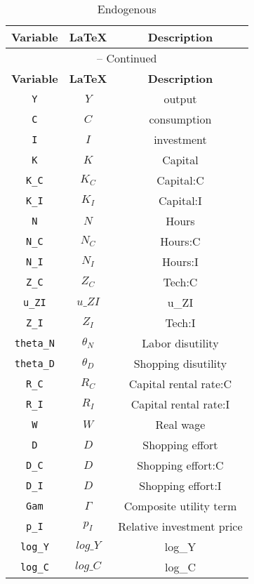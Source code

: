 \begin{center}
\begin{longtable}{ccc}
\caption{Endogenous}\\%
\hline%
\multicolumn{1}{c}{\textbf{Variable}} &
\multicolumn{1}{c}{\textbf{\LaTeX}} &
\multicolumn{1}{c}{\textbf{Description}}\\%
\hline\hline%
\endfirsthead
\multicolumn{3}{c}{{\tablename} \thetable{} -- Continued}\\%
\hline%
\multicolumn{1}{c}{\textbf{Variable}} &
\multicolumn{1}{c}{\textbf{\LaTeX}} &
\multicolumn{1}{c}{\textbf{Description}}\\%
\hline\hline%
\endhead
\texttt{Y} & ${Y}$ & output\\
\texttt{C} & ${C}$ & consumption\\
\texttt{I} & ${I}$ & investment\\
\texttt{K} & ${K}$ & Capital\\
\texttt{K\_C} & ${K_C}$ & Capital:C\\
\texttt{K\_I} & ${K_I}$ & Capital:I\\
\texttt{N} & ${N}$ & Hours\\
\texttt{N\_C} & ${N_C}$ & Hours:C\\
\texttt{N\_I} & ${N_I}$ & Hours:I\\
\texttt{Z\_C} & ${Z_C}$ & Tech:C\\
\texttt{u\_ZI} & $u\_ZI$ & u\_ZI\\
\texttt{Z\_I} & ${Z_I}$ & Tech:I\\
\texttt{theta\_N} & ${\theta_N}$ & Labor disutility\\
\texttt{theta\_D} & ${\theta_D}$ & Shopping disutility\\
\texttt{R\_C} & ${R_C}$ & Capital rental rate:C\\
\texttt{R\_I} & ${R_I}$ & Capital rental rate:I\\
\texttt{W} & ${W}$ & Real wage\\
\texttt{D} & ${D}$ & Shopping effort\\
\texttt{D\_C} & ${D}$ & Shopping effort:C\\
\texttt{D\_I} & ${D}$ & Shopping effort:I\\
\texttt{Gam} & ${\Gamma}$ & Composite utility term\\
\texttt{p\_I} & ${p_I}$ & Relative investment price\\
\texttt{log\_Y} & $log\_Y$ & log\_Y\\
\texttt{log\_C} & $log\_C$ & log\_C\\

\end{longtable}
\end{center}
